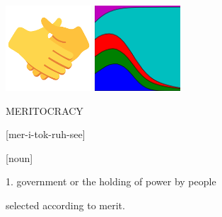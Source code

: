 \documentclass{beamer}
\begin{document}
\begin{frame}
    \begin{center}
    \includegraphics[width=0.24\textwidth]{static/shake.png} \hspace{6pt}
    \includegraphics[width=0.24\textwidth]{static/axelrod-logo.png}

    \end{center}
\end{frame}

\begin{frame}
    \begin{center}
    \begin{minipage}{.5\textwidth}
        \LARGE{MERITOCRACY}
    \end{minipage}
    \begin{minipage}{.3\textwidth}
        \normalsize{[mer-i-tok-ruh-see]}
    \end{minipage}
    \vspace{.5cm}

    \hspace{-8cm} \normalsize{[noun]}\\
    \end{center}
    \hspace{.8cm} \normalsize{1. government or the holding of power by people}

    \hspace{1cm}\normalsize{selected according to merit.}
\end{frame}
\end{document}

